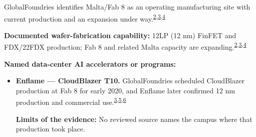 \begin{minipage}[t][0.90\textheight][t]{\textwidth}
\begin{minipage}[t]{\textwidth}
\begin{minipage}[t]{0.32\textwidth}
\medskip
{\footnotesize GlobalFoundries identifies Malta/Fab 8 as an operating manufacturing site with current production and an expansion under way.\nobreak\textsuperscript{\href{\detokenize{https://investors.gf.com/static-files/ef3116da-5334-46e0-9b6c-56d3e67b1b92}}{\textcolor{accent}{2}},\href{\detokenize{https://gf.com/news-and-events/news/globalfoundries-and-bae-systems-collaborate-on-semiconductors-for-space/}}{\textcolor{accent}{3}},\href{\detokenize{https://gf.com/news-and-events/blog/from-fab-to-the-field-accelerating-trusted-us-semiconductor-onshoring-for-mission-critical-defense/}}{\textcolor{accent}{4}}}\par}
\medskip
{\footnotesize\textbf{Documented wafer-fabrication capability:} 12LP (12 nm) FinFET and FDX/22FDX production; Fab 8 and related Malta capacity are expanding.\nobreak\textsuperscript{\href{\detokenize{https://investors.gf.com/static-files/ef3116da-5334-46e0-9b6c-56d3e67b1b92}}{\textcolor{accent}{2}},\href{\detokenize{https://gf.com/news-and-events/news/globalfoundries-and-bae-systems-collaborate-on-semiconductors-for-space/}}{\textcolor{accent}{3}},\href{\detokenize{https://gf.com/news-and-events/blog/from-fab-to-the-field-accelerating-trusted-us-semiconductor-onshoring-for-mission-critical-defense/}}{\textcolor{accent}{4}}}\par}
\end{minipage}
\end{minipage}
\par\vspace{0.65em}
\medskip
{\footnotesize\textbf{Named data-center AI accelerators or programs:}\par}
\begin{itemize}[leftmargin=1.25em,itemsep=0.35em,topsep=0.15em,parsep=0pt]
\item {\footnotesize\textbf{Enflame --- CloudBlazer T10.} GlobalFoundries scheduled CloudBlazer production at Fab 8 for early 2020, and Enflame later confirmed 12 nm production and commercial use.\nobreak\textsuperscript{\href{\detokenize{https://gf.com/news-and-events/news/globalfoundries-and-bae-systems-collaborate-on-semiconductors-for-space/}}{\textcolor{accent}{3}},\href{\detokenize{https://investors.gf.com/news-releases/news-release-details/enflame-technology-announces-cloudblazer-dtu-chip}}{\textcolor{accent}{5}},\href{\detokenize{https://www.yicai.com/news/101103178.html}}{\textcolor{accent}{6}}}\par {\scriptsize\color{black!62}\textbf{Limits of the evidence:} No reviewed source names the campus where that production took place.\par}}

\end{itemize}
\end{minipage}
